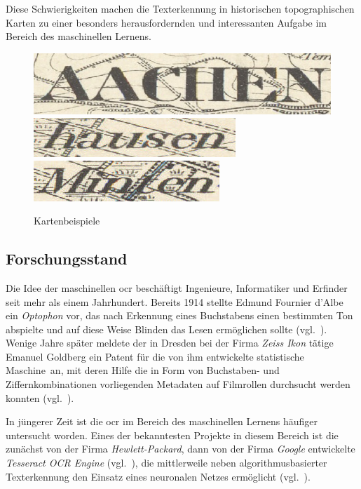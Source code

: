 Diese Schwierigkeiten machen die Texterkennung in historischen topographischen Karten zu einer besonders
herausfordernden und interessanten Aufgabe im Bereich des maschinellen Lernens.

\begin{figure}
    \centering
    \includegraphics{img/Aachen.jpg}
    \includegraphics{img/hausen.jpg}
    \includegraphics{img/Minten.jpg}
    \caption{Kartenbeispiele\label{einleitung:motivation:karten}}
\end{figure}

\subsection{Forschungsstand}
\label{einleitung:forschung}

Die Idee der maschinellen \gls{ocr} beschäftigt Ingenieure, Informatiker und Erfinder seit mehr als einem Jahrhundert.
Bereits 1914 stellte Edmund Fournier d'Albe ein \textit{Optophon} vor, das nach Erkennung eines Buchstabens einen
bestimmten Ton abspielte und auf diese Weise Blinden das Lesen ermöglichen sollte (vgl.~\cite{albe1914}). Wenige Jahre
später meldete der in Dresden bei der Firma \textit{Zeiss Ikon} tätige Emanuel Goldberg ein Patent für die von ihm
entwickelte \glqq statistische Maschine\grqq\ an, mit deren Hilfe die in Form von Buchstaben- und Ziffernkombinationen
vorliegenden Metadaten auf Filmrollen durchsucht werden konnten (vgl.~\cite{goldberg1931}).

In jüngerer Zeit ist die \gls{ocr} im Bereich des maschinellen Lernens häufiger untersucht worden. Eines der
bekanntesten Projekte in diesem Bereich ist die zunächst von der Firma \textit{Hewlett-Packard}, dann von der Firma
\textit{Google} entwickelte \textit{Tesseract OCR Engine} (vgl.~\cite{smith2007}), die mittlerweile neben
algorithmusbasierter Texterkennung den Einsatz eines neuronalen Netzes ermöglicht (vgl.~\cite{tesseract40}).

